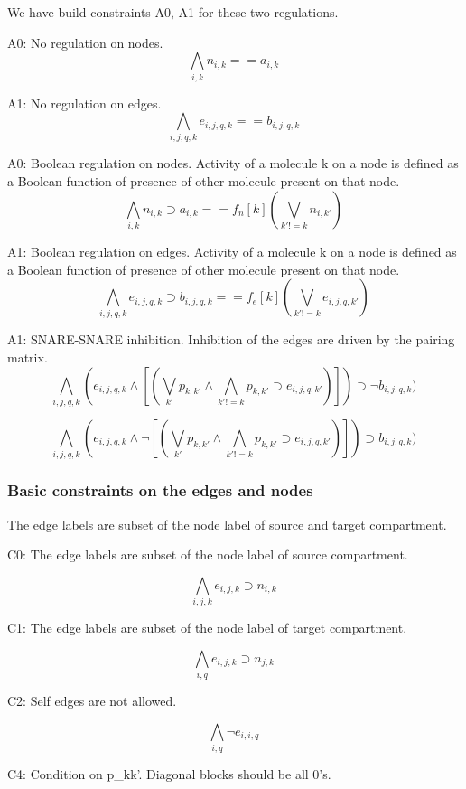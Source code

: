 We have build constraints A0, A1 for these two regulations. \newline

A0: No regulation on nodes.
\[ \bigwedge\limits_{i,k} n_{i,k} == a_{i,k} \, \]  

A1: No regulation on edges.
\[ \bigwedge\limits_{i,j,q,k} e_{i,j,q,k} == b_{i,j,q,k} \, \]  

A0: Boolean regulation on nodes. Activity of a molecule k on a node is defined as a Boolean function of presence of other molecule present on that node.
\[ \bigwedge\limits_{i,k} n_{i,k} \supset a_{i,k} ==   f_n[k] (\bigvee_{ k' != k} n_{i,k'}) \, \]  

A1: Boolean regulation on edges. Activity of a molecule k on a node is defined as a Boolean function of presence of other molecule present on that node.
\[ \bigwedge\limits_{i,j,q,k} e_{i,j,q,k} \supset b_{i,j,q,k} == f_e[k](\bigvee_{k' != k} e_{i,j,q,k'}) \, \]  

A1: SNARE-SNARE inhibition. Inhibition of the edges are driven by the pairing matrix.
\[ \bigwedge\limits_{i,j,q, k}  (e_{i,j,q,k} \land [ ( \bigvee_{k'} p_{k,k'} \land \bigwedge_{k' != k} p_{k,k'} \supset e_{i,j,q,k'})] ) \supset \neg b_{i,j,q,k}) \, \]  

\[ \bigwedge\limits_{i,j, q, k}  (e_{i,j,q,k} \land \neg [ ( \bigvee_{k'} p_{k,k'} \land \bigwedge_{k' != k} p_{k,k'} \supset e_{i,j,q,k'})] ) \supset b_{i,j,q,k}) \, \]  

\subsubsection{Basic constraints on the edges and nodes}
The edge labels are subset of the node label of source and target compartment. \newline

C0: The edge labels are subset of the node label of source compartment.

\[ \bigwedge\limits_{i,j,k} e_{i,j,k} \supset n_{i,k} \, \]  

C1: The edge labels are subset of the node label of target compartment.

\[ \bigwedge\limits_{i,q}  e_{i,j,k} \supset n_{j,k} \, \]  

C2: Self edges are not allowed. 

\[  \bigwedge\limits_{i,q} \neg e_{i,i,q} \, \]

C4: Condition on p\_kk'. Diagonal blocks should be all 0's.

